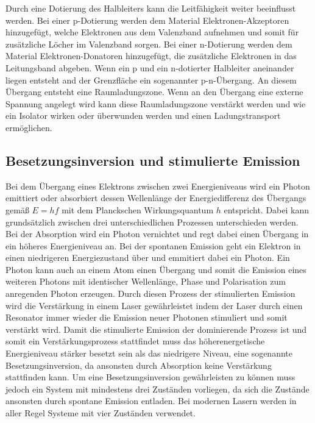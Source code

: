 Durch eine Dotierung des Halbleiters kann die Leitfähigkeit weiter beeinflusst werden. Bei einer p-Dotierung werden dem Material Elektronen-Akzeptoren hinzugefügt, welche Elektronen aus dem Valenzband aufnehmen und somit für zusätzliche Löcher im Valenzband sorgen. Bei einer n-Dotierung werden dem Material Elektronen-Donatoren hinzugefügt, die zusätzliche Elektronen in das Leitungsband abgeben. Wenn ein p und ein n-dotierter Halbleiter aneinander liegen entsteht and der Grenzfläche ein sogenannter p-n-Übergang. An diesem Übergang entsteht eine Raumladungszone. Wenn an den Übergang eine externe Spannung angelegt wird kann diese Raumladungszone verstärkt werden und wie ein Isolator wirken oder überwunden werden und einen Ladungstransport ermöglichen.
\subsection{Besetzungsinversion und stimulierte Emission}
Bei dem Übergang eines Elektrons zwischen zwei Energieniveaus wird ein Photon emittiert oder absorbiert dessen Wellenlänge der Energiedifferenz des Übergangs gemäß $E=hf$ mit dem Planckschen Wirkungsquantum $h$ entspricht.
Dabei kann grundsätzlich zwischen drei unterschiedlichen Prozessen unterschieden werden. Bei der Absorption wird ein Photon vernichtet und regt dabei einen Übergang in ein höheres Energieniveau an. Bei der spontanen Emission geht ein Elektron in einen niedrigeren Energiezustand über und emmitiert dabei ein Photon.
Ein Photon kann auch an einem Atom einen Übergang und somit die Emission eines weiteren Photons mit identischer Wellenlänge, Phase und Polarisation zum anregenden Photon erzeugen. Durch diesen Prozess der stimulierten Emission wird die Verstärkung in einem Laser gewährleistet indem der Laser durch einen Resonator immer wieder die Emission neuer Photonen stimuliert und somit verstärkt wird. Damit die stimulierte Emission der dominierende Prozess ist und somit ein Verstärkungsprozess stattfindet muss das höherenergetische Energieniveau stärker besetzt sein als das niedrigere Niveau, eine sogenannte Besetzungsinversion, da ansonsten durch Absorption keine Verstärkung stattfinden kann. Um eine Besetzungsinversion gewährleisten zu können muss jedoch ein System mit mindestens drei Zuständen vorliegen, da sich die Zustände ansonsten durch spontane Emission entladen. Bei modernen Lasern werden in aller Regel Systeme mit vier Zuständen verwendet. 
